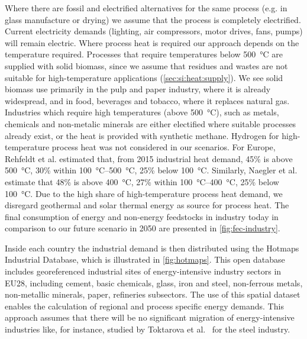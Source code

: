 Where there are fossil and electrified alternatives for the same process (e.g.
in glass manufacture or drying) we assume that the process is completely
electrified. Current electricity demands (lighting, air compressors, motor
drives, fans, pumps) will remain electric. Where process heat is required our
approach depends on the temperature required.
Processes that require temperatures below \SI{500}{\celsius} are supplied with
solid biomass, since we assume that residues and wastes are not suitable for
high-temperature applications (\cref{sec:si:heat:supply}). We see solid
biomass use primarily in the pulp and paper industry, where it is already
widespread, and in food, beverages and tobacco, where it replaces natural gas.
Industries which require high temperatures (above \SI{500}{\celsius}), such as
metals, chemicals and non-metalic minerals are either electified where suitable
processes already exist, or the heat is provided with synthetic methane.
Hydrogen for high-temperature process heat was not
considered in our scenarios. For Europe, Rehfeldt et al.
 estimated that, from 2015 industrial heat
demand, 45\% is above \SI{500}{\celsius}, 30\% within
\SIrange{100}{500}{\celsius}, 25\% below \SI{100}{\celsius}. Similarly, Naegler
et al.  estimate that 48\% is above
\SI{400}{\celsius}, 27\% within \SIrange{100}{400}{\celsius}, 25\% below
\SI{100}{\celsius}. Due to the high share of high-temperature process heat
demand, we disregard geothermal and solar thermal energy as source for process
heat. The final consumption of energy and non-energy feedstocks in industry
today in comparison to our future scenario in 2050 are presented in
\cref{fig:fec-industry}.

Inside each country the industrial demand is then distributed using the Hotmaps
Industrial Database, which is illustrated in \cref{fig:hotmaps}. This open database includes
georeferenced industrial sites of energy-intensive industry sectors in EU28,
including cement, basic chemicals, glass, iron and steel, non-ferrous metals,
non-metallic minerals, paper, refineries subsectors. The use of this spatial
dataset enables the calculation of regional and process specific energy demands.
This approach assumes that there will be no significant migration of
energy-intensive industries like, for instance, studied by Toktarova et
al.~ for the steel industry.

